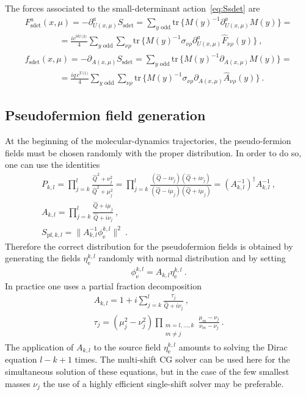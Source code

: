 \documentclass[11pt,fleqn]{article}
\newcommand{\tr}{\mathrm{tr}\,}
\begin{document}
The forces associated to the small-determinant action~\eqref{eq:Ssdet} are
\begin{gather}
   F_\text{sdet}^a(x,\mu)
   =
   - \partial_{U(x,\mu)}^a S_\text{sdet}
   =
   \sum_{y \text{ odd}} \tr \{ M(y)^{-1} \partial_{U(x,\mu)}^a M(y) \}
   = \nonumber \\ \qquad \qquad =
   \frac{i c^\text{SU(3)}}{4} \sum_{y \text{ odd}} \sum_{\nu\rho} \tr \{ M(y)^{-1} \sigma_{\nu\rho} \partial_{U(x,\mu)}^a \widehat{F}_{\nu\rho}(y) \}
   \ , \\
   f_\text{sdet}(x,\mu)
   =
   - \partial_{A(x,\mu)} S_\text{sdet}
   =
   \sum_{y \text{ odd}} \tr \{ M(y)^{-1} \partial_{A(x,\mu)} M(y) \}
   = \nonumber \\ \qquad \qquad =
   \frac{i q\, c^\text{U(1)}}{4} \sum_{y \text{ odd}} \sum_{\nu\rho} \tr \{ M(y)^{-1} \sigma_{\nu\rho} \partial_{A(x,\mu)} \widehat{A}_{\nu\rho}(y) \}
   \ .
\end{gather}





\subsection{Pseudofermion field generation}

At the beginning of the molecular-dynamics trajectories, the pseudo-fermion fields must be chosen randomly with the proper distribution. In order to do so, one can use the identities
\begin{gather}
   P_{k,l}
   =
   \prod_{j=k}^l \frac{\hat{Q}^2 + \nu_j^2}{\hat{Q}^2 + \mu_j^2}
   =
   \prod_{j=k}^l \frac{(\hat{Q} - i \nu_j)(\hat{Q} + i \nu_j)}{(\hat{Q} - i\mu_j)(\hat{Q} + i\mu_j)}
   =
   (A_{k,l}^{-1})^\dag A_{k,l}^{-1}
   \ , \\
   A_{k,l}
   =
   \prod_{j=k}^l \frac{\hat{Q} + i \mu_j}{\hat{Q} + i \nu_j}
   \label{eq:Afactor}
   \ , \\
   S_{\text{pf},k,l} = \| A_{k,l}^{-1} \phi^{k,l}_\text{e} \|^2 \ .
   \label{eq:Spf3}
\end{gather}
Therefore the correct distribution for the pseudofermion fields is obtained by generating the fields $\eta^{k,l}_\text{e}$ randomly with normal distribution and by setting
\begin{gather}
   \phi^{k,l}_\text{e} = A_{k,l} \eta^{k,l}_\text{e} \ .
\end{gather}
In practice one uses a partial fraction decomposition
\begin{gather}
   A_{k,l} = 1 + i \sum_{j=k}^l \frac{\tau_j}{\hat{Q} + i \nu_j}
   \ , \\
   \tau_j = (\mu_j^2 - \nu_j^2) \prod_{\substack{m=l,\dots,k\\m \neq j}} \frac{\mu_m-\nu_j}{\nu_m-\nu_j}
   \ .
\end{gather}
The application of $A_{k,l}$ to the source field $\eta^{k,l}_\text{e}$ amounts to solving the Dirac equation $l−k+1$ times. The multi-shift CG solver can be used here for the simultaneous solution of these equations, but in the case of the few smallest masses $\nu_j$ the use of a highly efficient single-shift solver may be preferable.
\end{document}
